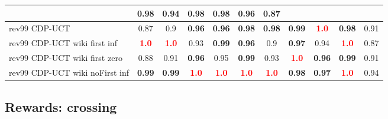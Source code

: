 \documentclass{article}
\begin{document}
\begin{tabular}{|l|r@{$\pm$}rr@{$\pm$}rr@{$\pm$}rr@{$\pm$}rr@{$\pm$}rr@{$\pm$}rr@{$\pm$}rr@{$\pm$}rr@{$\pm$}rr@{$\pm$}r|}
& \multicolumn{2}{c}{0.98}
& \multicolumn{2}{c}{0.94}
& \multicolumn{2}{c}{0.98}
& \multicolumn{2}{c}{0.98}
& \multicolumn{2}{c}{0.96}
& \multicolumn{2}{c|}{0.87}
\\
\hline
rev99 CDP-UCT
& \multicolumn{2}{c}{0.87}
& \multicolumn{2}{c}{0.9}
& \multicolumn{2}{c}{\textbf{0.96}}
& \multicolumn{2}{c}{\textbf{0.96}}
& \multicolumn{2}{c}{\textbf{0.98}}
& \multicolumn{2}{c}{\textbf{0.98}}
& \multicolumn{2}{c}{\textbf{0.99}}
& \multicolumn{2}{c}{\textbf{\textcolor{red}{1.0}}}
& \multicolumn{2}{c}{\textbf{0.98}}
& \multicolumn{2}{c|}{0.91}
\\
rev99 CDP-UCT wiki first inf
& \multicolumn{2}{c}{\textbf{\textcolor{red}{1.0}}}
& \multicolumn{2}{c}{\textbf{\textcolor{red}{1.0}}}
& \multicolumn{2}{c}{0.93}
& \multicolumn{2}{c}{\textbf{0.99}}
& \multicolumn{2}{c}{\textbf{0.96}}
& \multicolumn{2}{c}{0.9}
& \multicolumn{2}{c}{\textbf{0.97}}
& \multicolumn{2}{c}{0.94}
& \multicolumn{2}{c}{\textbf{\textcolor{red}{1.0}}}
& \multicolumn{2}{c|}{0.87}
\\
rev99 CDP-UCT wiki first zero
& \multicolumn{2}{c}{0.88}
& \multicolumn{2}{c}{0.91}
& \multicolumn{2}{c}{\textbf{0.96}}
& \multicolumn{2}{c}{0.95}
& \multicolumn{2}{c}{\textbf{0.99}}
& \multicolumn{2}{c}{0.93}
& \multicolumn{2}{c}{\textbf{\textcolor{red}{1.0}}}
& \multicolumn{2}{c}{\textbf{0.96}}
& \multicolumn{2}{c}{\textbf{0.99}}
& \multicolumn{2}{c|}{0.91}
\\
rev99 CDP-UCT wiki noFirst inf
& \multicolumn{2}{c}{\textbf{0.99}}
& \multicolumn{2}{c}{\textbf{0.99}}
& \multicolumn{2}{c}{\textbf{\textcolor{red}{1.0}}}
& \multicolumn{2}{c}{\textbf{\textcolor{red}{1.0}}}
& \multicolumn{2}{c}{\textbf{\textcolor{red}{1.0}}}
& \multicolumn{2}{c}{\textbf{\textcolor{red}{1.0}}}
& \multicolumn{2}{c}{\textbf{0.98}}
& \multicolumn{2}{c}{\textbf{0.97}}
& \multicolumn{2}{c}{\textbf{\textcolor{red}{1.0}}}
& \multicolumn{2}{c|}{0.94}
\\
\hline
\end{tabular}%

\bigskip

\subsection*{Rewards: crossing}
\end{document}
